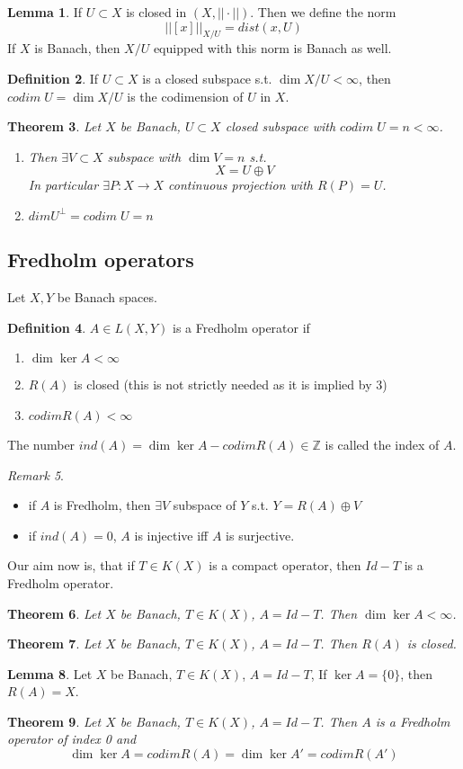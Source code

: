 \documentclass[a4paper, 12pt]{article}
\theoremstyle{plain}
\newtheorem{theorem}{Theorem}[subsection] %
\theoremstyle{definition}
\newtheorem{definition}[theorem]{Definition} %
\theoremstyle{lemma}
\newtheorem{lemma}[theorem]{Lemma}
\theoremstyle{remark}
\newtheorem{remark}[theorem]{Remark}
\theoremstyle{corollary}
\theoremstyle{example}
\begin{document}
	\begin{lemma}
		If $U\subset X$ is closed in $(X,||\cdot||)$. Then we define the norm \[||[x]||_{X/U} = dist(x,U)\] If $X$ is Banach, then $X/U$ equipped with this norm is Banach as well.
	\end{lemma}
	\begin{definition}
		If $U\subset X$ is a closed subspace s.t. $\dim X/U < \infty$, then $codim \;U = \dim X/U$ is the codimension of $U$ in $X$.
	\end{definition}
	\begin{theorem}
		Let $X$ be Banach, $U\subset X$ closed subspace with $codim \;U = n < \infty$. \begin{enumerate}
			\item Then $\exists V \subset X$ subspace with $\dim V = n$ s.t. \[X = U\oplus V\] In particular $\exists P:X \to X$ continuous projection with $R(P) = U$.
			\item $dim U^\bot = codim \; U = n$
		\end{enumerate}
	\end{theorem}
	\subsection{Fredholm operators}
	Let $X,Y$ be Banach spaces.
	\begin{definition}
		$A\in L(X,Y)$ is a Fredholm operator if \begin{enumerate}
			\item $\dim \ker A < \infty$
			\item $R(A)$ is closed (this is not strictly needed as it is implied by 3)
			\item $codim R(A) < \infty$
		\end{enumerate}
		The number $ind (A) = \dim \ker A - codim R(A) \in \mathbb{Z}$ is called the index of $A$.
	\end{definition}
	\begin{remark}
		\begin{itemize}
			\item if $A$ is Fredholm, then $\exists V$ subspace of $Y$ s.t. $Y = R(A) \oplus V$
			\item if $ind(A) = 0$, $A$ is injective iff $A$ is surjective.
		\end{itemize}
	\end{remark}
	Our aim now is, that if $T \in K(X)$ is a compact operator, then $Id-T$ is a Fredholm operator.
	\begin{theorem}
		Let $X$ be Banach, $T\in K(X)$, $A = Id - T$. Then $\dim \ker A < \infty$.
	\end{theorem}
	\begin{theorem}
		Let $X$ be Banach, $T \in K(X)$, $A=Id - T$. Then $R(A)$ is closed.
	\end{theorem}
	\begin{lemma}
		Let $X$ be Banach, $T\in K(X)$, $A= Id-T$, If $\ker A = \{0\}$, then $R(A) = X$.
	\end{lemma}
	\begin{theorem}
		Let $X$ be Banach, $T\in K(X)$, $A = Id-T$. Then $A$ is a Fredholm operator of index 0 and $$\dim \ker A = codim R(A) = \dim \ker A' = codim R(A')$$
	\end{theorem}
\end{document}
